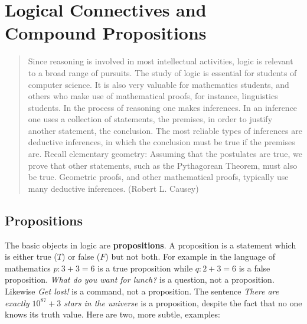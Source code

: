 \chapter{Logical Connectives and Compound Propositions}\label{ch:logic prop}


\begin{quote}
 Since reasoning is involved in most intellectual activities, logic is relevant to a broad range of pursuits. The study of logic is essential for students of computer science. It is also very valuable for mathematics students, and others who make use of mathematical proofs, for instance, linguistics students. In the process of reasoning one makes inferences. In an inference one uses a collection of statements, the premises, in order to justify another statement, the conclusion. The most reliable types of inferences are deductive inferences, in which the conclusion must be true if the premises are. Recall elementary geometry: Assuming that the postulates are true, we prove that other statements, such as the Pythagorean Theorem, must also be true. Geometric proofs, and other mathematical proofs, typically use many deductive inferences. (Robert L. Causey)
\end{quote}
 
 
\section{Propositions} 
The basic objects in logic are {\bfseries propositions}. A proposition is a statement which is either true ($T$) or
false ($F$) but not both. For example in the language of mathematics $\mathit p : 3+3=6$ is a true proposition
while  $\mathit q:2+3=6$ is a false proposition. {\itshape What do you want for lunch?} is a question, 
not a proposition. Likewise {\itshape Get lost!} is a command, not a proposition. 
The sentence {\itshape There are exactly $10^{87} + 3$ stars in the universe} is a proposition, despite the fact
that no one knows its truth value. Here are two, more subtle, examples:

